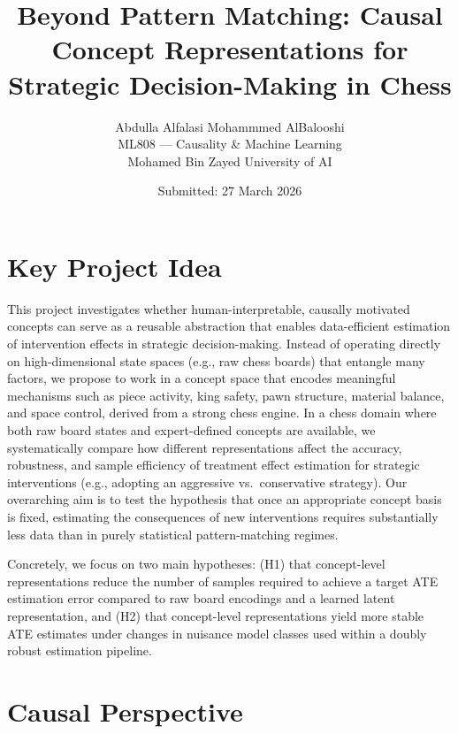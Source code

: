 \documentclass[11pt]{article}
\title{
\vspace{-2.5em}
\textbf{Beyond Pattern Matching: Causal Concept Representations for Strategic Decision-Making in Chess}
\vspace{-1em}
}
\author{
Abdulla Alfalasi \quad Mohammmed AlBalooshi \\
\small ML808 --- Causality \& Machine Learning \\
\small Mohamed Bin Zayed University of AI
}
\date{Submitted: 27 March 2026}
\begin{document}
\maketitle
\vspace{-2.5em}

\section*{Key Project Idea}

This project investigates whether human-interpretable, causally motivated concepts can serve as a reusable abstraction that enables data-efficient estimation of intervention effects in strategic decision-making.\cite{scholkopf2021towards,pearl2009causality} Instead of operating directly on high-dimensional state spaces (e.g., raw chess boards) that entangle many factors, we propose to work in a concept space that encodes meaningful mechanisms such as piece activity, king safety, pawn structure, material balance, and space control, derived from a strong chess engine.\cite{lemeire2005causalmodelsinchess,stockfish} In a chess domain where both raw board states and expert-defined concepts are available, we systematically compare how different representations affect the accuracy, robustness, and sample efficiency of treatment effect estimation for strategic interventions (e.g., adopting an aggressive vs.\ conservative strategy).\cite{chernozhukov2018double,scholkopf2021towards} Our overarching aim is to test the hypothesis that once an appropriate concept basis is fixed, estimating the consequences of new interventions requires substantially less data than in purely statistical pattern-matching regimes.\cite{lake2017building,scholkopf2021towards}

Concretely, we focus on two main hypotheses: (H1) that concept-level representations reduce the number of samples required to achieve a target ATE estimation error compared to raw board encodings and a learned latent representation, and (H2) that concept-level representations yield more stable ATE estimates under changes in nuisance model classes used within a doubly robust estimation pipeline.

\section*{Causal Perspective}
\end{document}
